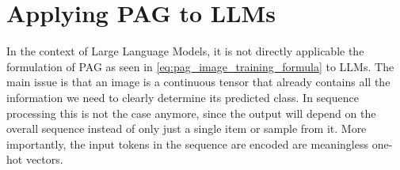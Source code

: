 \documentclass[../thesis.tex]{subfiles}
\begin{document}
\begin{table}[ht]
\vspace{0.25cm}
\caption{Adversarial attacks comparing the PAG variants - \textbf{multiclass} classifier}
\label{table:pag_variants_multiclass}
\end{table}

\section{Applying PAG to LLMs}
In the context of Large Language Models, it is not directly applicable the formulation of PAG as seen in \cref{eq:pag_image_training_formula} to LLMs.
The main issue is that an image is a continuous tensor that already contains all the information we need to clearly determine its predicted class.
In sequence processing this is not the case anymore, since the output will depend on the overall sequence instead of only just a single item or sample from it.
More importantly, the input tokens in the sequence are encoded are meaningless one-hot vectors.
\end{document}
